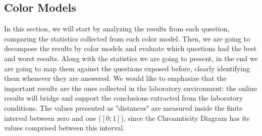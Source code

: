 \subsection{Color Models}
\label{subsec:results_colormodels}
%
In this section, we will start by analyzing the results from each question, comparing the statistics collected from each color model. Then, we are going to decompose the results by color models and evaluate which questions
had the best and worst results. Along with the statistics we are going to present, in the end we are going to map them against the questions exposed before, clearly identifying them whenever they are answered. We would like
to emphasize that the important results are the ones collected in the laboratory environment: the online results will bridge and support the conclusions extracted from the laboratory conditions. The values presented as "distances"
are measured inside the finite interval between zero and one ($[0 ; 1]$), since the Chroamticity Diagram has its values comprised between this interval. \par
%
